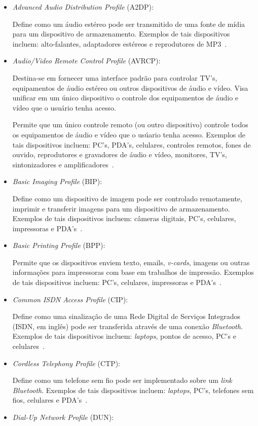\begin{itemize}
	\item \emph{Advanced Audio Distribution Profile} (A2DP): 

	Define como um áudio estéreo pode ser transmitido de uma fonte de mídia para um dispositivo de armazenamento. Exemplos de tais dispositivos incluem: alto-falantes, adaptadores estéreos e reprodutores de MP3~\cite{bluetoothprofilesA2DP}.
	\item \emph{Audio/Video Remote Control Profile} (AVRCP): 

	Destina-se em fornecer uma interface padrão para controlar TV's, equipamentos de áudio estéreo ou outros dispositivos de áudio e vídeo. Visa unificar em um único dispositivo o controle dos equipamentos de áudio e vídeo que o usuário tenha acesso.

	Permite que um único controle remoto (ou outro dispositivo) controle todos os equipamentos de áudio e vídeo que o usúario tenha acesso. Exemplos de tais dispositivos incluem: PC's, PDA's, celulares, controles remotos, fones de ouvido, reprodutores e gravadores de áudio e vídeo, monitores, TV's, sintonizadores e amplificadores~\cite{bluetoothprofilesAVRCP}.
	\item \emph{Basic Imaging Profile} (BIP): 

	Define como um dispositivo de imagem pode ser controlado remotamente, imprimir e transferir imagens para um dispositivo de armazenamento. Exemplos de tais dispositivos incluem: câmeras digitais, PC's, celulares, impressoras e PDA's~\cite{bluetoothprofilesBIP}.
	\item \emph{Basic Printing Profile} (BPP): 

	Permite que os dispositivos enviem texto, emails, \emph{v-cards}, imagens ou outras informações para impressoras com base em trabalhos de impressão. Exemplos de tais dispositivos incluem: PC's, celulares, impressoras e PDA's~\cite{bluetoothprofilesBPP}.
	\item \emph{Common ISDN Access Profile} (CIP): 

	Define como uma sinalização de uma Rede Digital de Serviços Integrados (ISDN, em inglês) pode ser transferida através de uma conexão \emph{Bluetooth}. Exemplos de tais dispositivos incluem: \emph{laptops}, pontos de acesso, PC's e celulares~\cite{bluetoothprofilesCIP}.
	\item \emph{Cordless Telephony Profile} (CTP): 

	Define como um telefone sem fio pode ser implementado sobre um \emph{link} \emph{Bluetooth}. Exemplos de tais dispositivos incluem: \emph{laptops}, PC's, telefones sem fios, celulares e PDA's~\cite{bluetoothprofilesCTP}.
	\item \emph{Dial-Up Network Profile} (DUN): 


\end{itemize}
